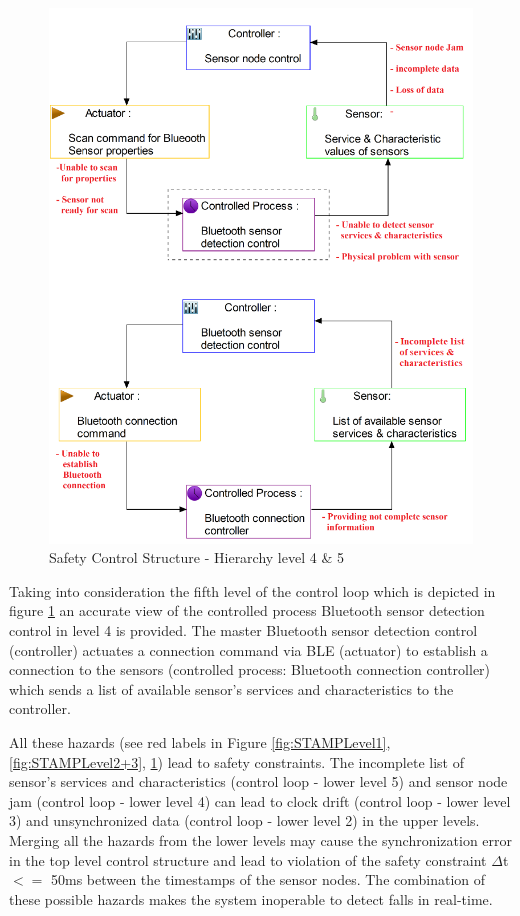 \documentclass[review]{elsarticle}
\begin{document}
\begin{itemize}
		\begin{figure}[!ht]
		\centering
		\includegraphics[scale=0.65]{images/STAMP4+5level(2)}
		\caption[Safety Control Structure - Hierarchy level 4 \& 5]{Safety Control Structure - Hierarchy level 4 \& 5}
		\label{fig:STAMPLevel4+5}
	\end{figure}

	Taking into consideration the fifth level of the control loop which is depicted in figure \ref{fig:STAMPLevel4+5} an accurate view of the controlled process Bluetooth sensor detection control in level 4 is provided. The master Bluetooth sensor detection control (controller) actuates a connection command via BLE (actuator) to establish a connection to the sensors (controlled process: Bluetooth connection controller) which sends a list of available sensor's services and characteristics to the controller. 
	
	All these hazards (see red labels in Figure \ref{fig:STAMPLevel1}, \ref{fig:STAMPLevel2+3}, \ref{fig:STAMPLevel4+5}) lead to safety constraints. The incomplete list of sensor's services and characteristics (control loop - lower level 5) and sensor node jam (control loop - lower level 4) can lead to clock drift (control loop - lower level 3) and unsynchronized data (control loop - lower level 2) in the upper levels. Merging all the hazards from the lower levels may cause the synchronization error in the top level control structure and lead to violation of the safety constraint $\Delta$t $<=$ 50ms between the timestamps of the sensor nodes. The combination of these possible hazards makes the system inoperable to detect falls in real-time.
	

\end{itemize}
\end{document}
